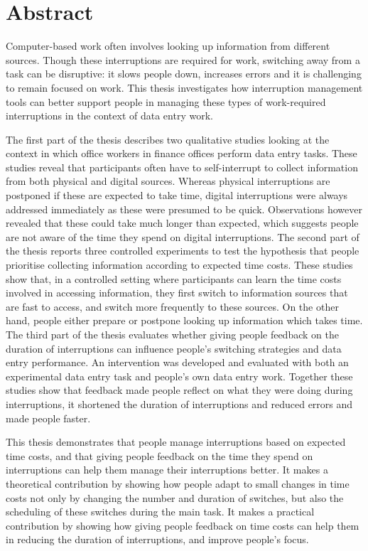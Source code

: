 \chapter*{Abstract}
Computer-based work often involves looking up information from different sources. Though these interruptions are required for work, switching away from a task can be disruptive: it slows people down, increases errors and it is challenging to remain focused on work. This thesis investigates how interruption management tools can better support people in managing these types of work-required interruptions in the context of data entry work.

The first part of the thesis describes two qualitative studies looking at the context in which office workers in finance offices perform data entry tasks. These studies reveal that participants often have to self-interrupt to collect information from both physical and digital sources. Whereas physical interruptions are postponed if these are expected to take time, digital interruptions were always addressed immediately as these were presumed to be quick. Observations however revealed that these could take much longer than expected, which suggests people are not aware of the time they spend on digital interruptions. 
The second part of the thesis reports three controlled experiments to test the hypothesis that people prioritise collecting information according to expected time costs. These studies show that, in a controlled setting where participants can learn the time costs involved in accessing information, they first switch to information sources that are fast to access, and switch more frequently to these sources. On the other hand, people either prepare or postpone looking up information which takes time.
The third part of the thesis evaluates whether giving people feedback on the duration of interruptions can influence people's switching strategies and data entry performance. An intervention was developed and evaluated with both an experimental data entry task and people's own data entry work. Together these studies show that feedback made people reflect on what they were doing during interruptions, it shortened the duration of interruptions and reduced errors and made people faster.

This thesis demonstrates that people manage interruptions based on expected time costs, and that giving people feedback on the time they spend on interruptions can help them manage their interruptions better. It makes a theoretical contribution by showing how people adapt to small changes in time costs not only by changing the number and duration of switches, but also the scheduling of these switches during the main task. It makes a practical contribution by showing how giving people feedback on time costs can help them in reducing the duration of interruptions, and improve people’s focus. 